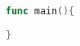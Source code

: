 \documentclass{article}
\begin{document}
\begin{gofile}
\begin{lstlisting}[language=go]
func main(){
    
}
\end{lstlisting}
\end{gofile}
\end{document}
